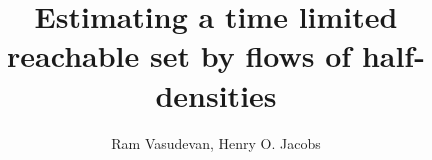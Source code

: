 \documentclass[letterpaper, 10pt, conference]{ieeeconf}
\title{Estimating a time limited reachable set by flows of half-densities}
\author{Ram Vasudevan, Henry O. Jacobs}
\theoremstyle{nospace}
\begin{document}
\maketitle

\begin{abstract}

\end{abstract}











\end{document}
